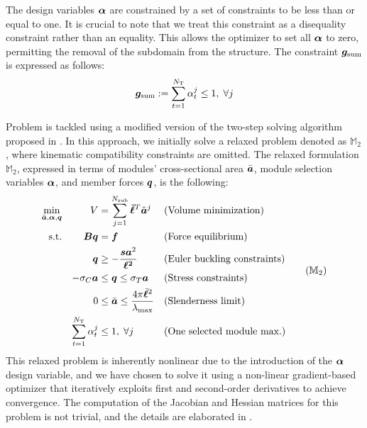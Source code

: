 The design variables $\bm{\alpha}$ are constrained by a set of constraints to be less than or equal to one. It is crucial to note that we treat this constraint as a disequality constraint rather than an equality. This allows the optimizer to set all $\bm{\alpha}$ to zero, permitting the removal of the subdomain from the structure. The constraint $\bm{g}_\text{sum}$ is expressed as follows:
\begin{equation}
    \bm{g}_\text{sum}:=\sum_{t=1}^{N_\text{T}} \alpha_t^j \leq 1, \; \forall j 
\end{equation}

Problem  is tackled using a modified version of the two-step solving algorithm proposed in . In this approach, we initially solve a relaxed problem denoted as $\mathbb{M}_2$, where kinematic compatibility constraints are omitted. The relaxed formulation $\mathbb{M}_2$, expressed in terms of modules' cross-sectional area $\bar{\bm{a}}$, module selection variables $\bm{\alpha}$, and member forces $\bm{q}$, is the following:
\begin{equation}
    \begin{aligned}
    \min_{\bar{\vect{a}}, \vect{\alpha}, \bm{q}}   && V &= \sum_{j=1}^{N_{\text{sub}}}\vect{\bar{\ell}}^T\tilde{\vect{a}}^j && \textrm{(Volume minimization)}\\
    \textrm{s.t.}   && \bm{B}\bm{q} &= \bm{f} && \textrm{(Force equilibrium)}\\
                    && \bm{q} &\geq -\frac{\bm{s}\bm{a}^2}{\bm{\ell^2}} && \textrm{(Euler buckling constraints)} \\
                    && -\sigma_C\bm{a} &\leq \bm{q} \leq \sigma_T\bm{a} && \textrm{(Stress constraints)} \\
                    && 0 &\leq \bar{\vect{a}} \leq \frac{4 \pi \bar{\vect{\ell}}^2}{\lambda_{\text{max}}} && \textrm{(Slenderness limit)} \\
                    && \sum_{t=1}^{N_\text{T}} \alpha_t^j &\leq 1, \; \forall j && \textrm{(One selected module max.)} \\
    \end{aligned}
    \tag{$\mathbb{M}_2$}
    \label{eq:06_optim_relax}
\end{equation}
This relaxed problem is inherently nonlinear due to the introduction of the $\bm{\alpha}$ design variable, and we have chosen to solve it using a non-linear gradient-based optimizer that iteratively exploits first and second-order derivatives to achieve convergence. The computation of the Jacobian and Hessian matrices for this problem is not trivial, and the details are elaborated in . 

